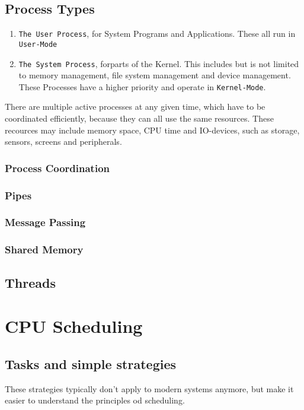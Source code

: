 \documentclass[a4paper, 11pt]{article}
\begin{document}
    \subsection{Process Types}
    \begin{enumerate}
      \item \texttt{The User Process}, for System Programs and Applications. These all run in \texttt{User-Mode}
      \item \texttt{The System Process}, forparts of the Kernel. This includes but is not limited
            to memory management, file system management and device management. These Processes have a higher
            priority and operate in \texttt{Kernel-Mode}.
    \end{enumerate}
    There are multiple active processes at any given time, which have to be coordinated efficiently, because they can all
    use the same resources. These recources may include memory space, CPU time and IO-devices, such as storage, sensors, screens and peripherals.

    \subsubsection{Process Coordination}

    \subsubsection{Pipes}
    \subsubsection{Message Passing}
    \subsubsection{Shared Memory}

    \subsection{Threads}
    \newpage

    \section{CPU Scheduling}
    \subsection{Tasks and simple strategies}
    These strategies typically don't apply to modern systems anymore, but make it easier to understand the principles od scheduling.
\end{document}
